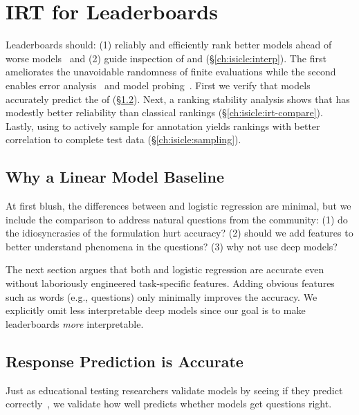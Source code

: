 \section{IRT for Leaderboards}
\label{ch:isicle:exp}

Leaderboards should: (1) reliably and efficiently rank
better models ahead of worse
models~\citep{sutcliffe1992pragmatics,voorhees2003evaluating} and (2)
guide inspection of \itms{} and \subjs{} (\S\ref{ch:isicle:interp}).
%
The first ameliorates the unavoidable randomness
of finite evaluations while the second enables
error analysis~\citep{wu2019errudite} and model
probing~\citep{belinkov2019survey,zhang2019manifold}.
%
First we verify that \irt{} models accurately predict the \resps{} of
\subjs{} (\S\ref{ch:isicle:irt-accurate}).
%
Next, a ranking stability analysis shows that \irt{} has
modestly better reliability than classical rankings
(\S\ref{ch:isicle:irt-compare}).
%
Lastly, using \irt{} to actively sample \itms{} for annotation yields
rankings with better correlation to complete test data
(\S\ref{ch:isicle:sampling}).

\subsection{Why a Linear Model Baseline}

At first blush, the differences between \irt{} and logistic regression
are minimal, but we include the comparison to address natural
questions from the  community:
%
(1) do the idiosyncrasies of the \irt{} formulation hurt
accuracy?
%
(2) should we add features to better understand phenomena
in the questions?
%
(3) why not use deep models?

The next section argues that both \irt{} and logistic regression are
accurate even without laboriously engineered task-specific features.
%
Adding obvious features such as \itm{} words (e.g., questions)
only minimally improves the accuracy.
%
We explicitly omit less interpretable deep models since our goal is to
make leaderboards \emph{more} interpretable.

\subsection{Response Prediction is Accurate}
\label{ch:isicle:irt-accurate}

Just as educational testing researchers validate \irt{} models by
seeing if they predict \subj{} \resps{}
correctly~\citep{aera2014standards}, we validate how well \name{} predicts
whether \squad{} models get questions right.


